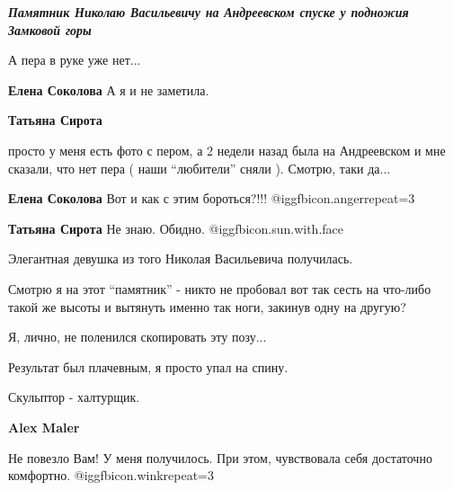  
 
 
 
 


{\em\color{blue}\bfseries Памятник Николаю Васильевичу на Андреевском спуске у подножия Замковой горы}

А пера в руке уже нет...

\textbf{Елена Соколова} А я и не заметила.

\textbf{Татьяна Сирота} 

просто у меня есть фото с пером, а 2 недели назад была на Андреевском и мне
сказали, что нет пера ( наши \enquote{любители} сняли ). Смотрю, таки да...


\textbf{Елена Соколова} Вот и как с этим бороться?!!! @igg{fbicon.anger}{repeat=3} 

\textbf{Татьяна Сирота} Не знаю. Обидно. @igg{fbicon.sun.with.face} 

Элегантная девушка из того Николая Васильевича получилась.


Смотрю я на этот \enquote{памятник} - никто не пробовал вот так сесть на что-либо такой
же высоты и вытянуть именно так ноги, закинув одну на другую?

Я, лично, не поленился скопировать эту позу...

Результат был плачевным, я просто упал на спину.

Скульптор - халтурщик.

\textbf{Alex Maler} 

Не повезло Вам! У меня получилось. При этом, чувствовала себя достаточно
комфортно. @igg{fbicon.wink}{repeat=3} 
